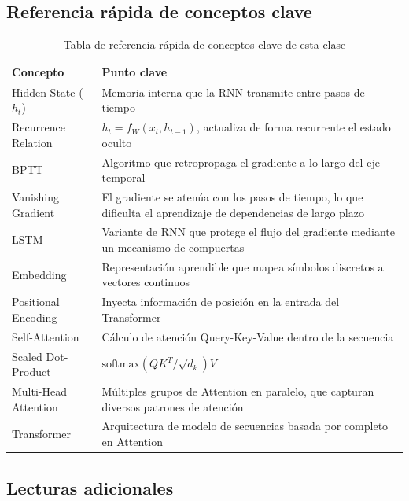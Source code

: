 \subsection{Referencia rápida de conceptos clave}

\begin{table}[H]
\centering
\caption{Tabla de referencia rápida de conceptos clave de esta clase}
\begin{tabular}{ll}
\toprule
\textbf{Concepto} & \textbf{Punto clave} \\
\midrule
Hidden State ($h_t$) & Memoria interna que la RNN transmite entre pasos de tiempo \\
Recurrence Relation & $h_t = f_W(x_t, h_{t-1})$, actualiza de forma recurrente el estado oculto \\
BPTT & Algoritmo que retropropaga el gradiente a lo largo del eje temporal \\
Vanishing Gradient & El gradiente se atenúa con los pasos de tiempo, lo que dificulta el aprendizaje de dependencias de largo plazo \\
LSTM & Variante de RNN que protege el flujo del gradiente mediante un mecanismo de compuertas \\
Embedding & Representación aprendible que mapea símbolos discretos a vectores continuos \\
Positional Encoding & Inyecta información de posición en la entrada del Transformer \\
Self-Attention & Cálculo de atención Query-Key-Value dentro de la secuencia \\
Scaled Dot-Product & $\text{softmax}(QK^T/\sqrt{d_k})V$ \\
Multi-Head Attention & Múltiples grupos de Attention en paralelo, que capturan diversos patrones de atención \\
Transformer & Arquitectura de modelo de secuencias basada por completo en Attention \\
\bottomrule
\end{tabular}
\end{table}

\subsection{Lecturas adicionales}

